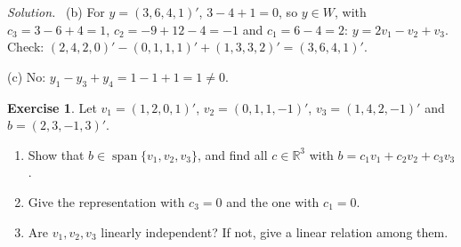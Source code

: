 \documentclass[12pt]{article}
\newcommand{\R}{\mathbb R}
\DeclareMathOperator{\Span}{span}
\theoremstyle{definition}
\newtheorem{exercise}{Exercise}
\newenvironment{solution}{\par\noindent\textit{Solution.}\ }{\par\smallskip}
\begin{document}
\begin{solution}
(b) For \(y=(3,6,4,1)'\), \(3-4+1=0\), so \(y\in W\), with \(c_3=3-6+4=1\), \(c_2=-9+12-4=-1\) and
\(c_1=6-4=2\): \(y=2v_1-v_2+v_3\). Check: \((2,4,2,0)'-(0,1,1,1)'+(1,3,3,2)'=(3,6,4,1)'\).

(c) No: \(y_1-y_3+y_4=1-1+1=1\ne0\).
\end{solution}

\begin{exercise}\label{r3-dr-representations}
Let \(v_1=(1,2,0,1)'\), \(v_2=(0,1,1,-1)'\), \(v_3=(1,4,2,-1)'\) and \(b=(2,3,-1,3)'\).
\begin{enumerate}
\item Show that \(b\in\Span\{v_1,v_2,v_3\}\), and find all \(c\in\R^3\) with \(b=c_1v_1+c_2v_2+c_3v_3\).
\item Give the representation with \(c_3=0\) and the one with \(c_1=0\).
\item Are \(v_1,v_2,v_3\) linearly independent? If not, give a linear relation among them.
\end{enumerate}
\end{exercise}
\end{document}
